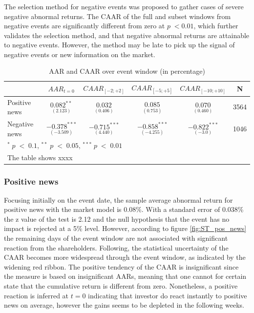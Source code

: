 The selection method for negative events was proposed to gather cases of severe negative abnormal returns. The CAAR of the full and subset windows from negative events are significantly different from zero at $p \; < 0.01$, which further validates the selection method, and that negative abnormal returns are attainable to negative events. However, the method may be late to pick up the signal of negative events or new information on the market.  

\begin{table}[ht]
\centering
\caption{AAR and CAAR over event window (in percentage)} 
\begin{tabular}{lccccc}
   \hline  \hline
  & $AAR_{t=0}$ & $CAAR_{[-2;+2]}$ & $CAAR_{[-5;+5]}$ & $CAAR_{[-10;+10]}$ & N \\
 \hline
Positive news & $\underset{(2.123)}{0.082^{**}}$  & $\underset{(0.406)}{0.032}$    &  $\underset{(0.753)}{0.085}$ & $\underset{(0.460)}{0.070}$ & 3564 \\ 
Negative news & $\underset{(-3.509)}{-0.378^{***}}$  & $\underset{(4.440)}{-0.715^{***}}$    & $\underset{(-4.255)}{-0.858^{***}}$ & $\underset{(-3.0)}{-0.822^{***}}$ & 1046\\ 
   \hline \hline
   \multicolumn{5}{p{12cm}}{\footnotesize  $^* \; p\; <\; 0.1$, $ ^{**} \; p\; <\; 0.05$, $ ^{***} \; p\; <\; 0.01$  } \\ 
   \multicolumn{5}{p{12cm}}{\footnotesize  The table shows xxxx  } \\
\hline
\end{tabular}
\label{tab: ST_significace}
\end{table}

\subsubsection{Positive news}

Focusing initially on the event date, the sample average abnormal return for positive news with the market model is 0.08\%. With a standard error of 0.038\% the z value of the test is 2.12 and the null hypothesis that the event has no impact is rejected at a 5\% level. However, according to figure \ref{fig:ST_pos_news} the remaining days of the event window are not associated with significant reaction  from the shareholders. Following, the statistical uncertainty of the CAAR becomes more widespread through the event window, as indicated by the widening red ribbon. The positive tendency of the CAAR is insignificant since the measure is based on insignificant AARs, meaning that one cannot for certain state that the cumulative return is different from zero. Nonetheless, a positive reaction is inferred at $t=0$ indicating that investor do react instantly to positive news on average, however the gains seems to be depleted in the following weeks.  

